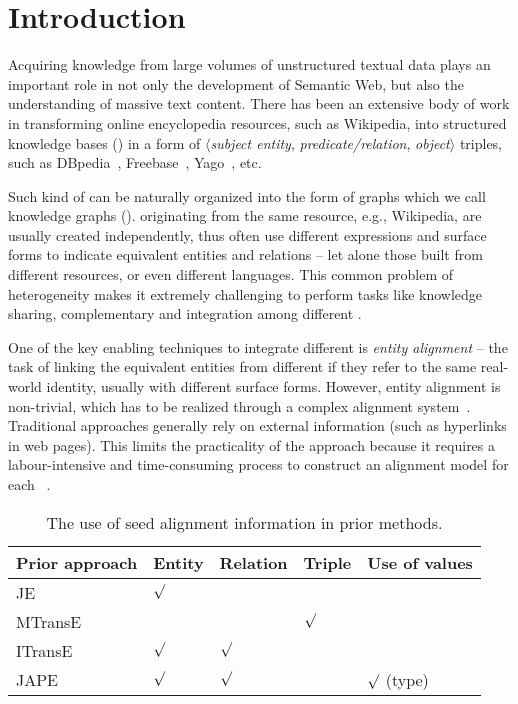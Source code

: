 	
	\section{Introduction}
	\label{section:intro}
    Acquiring knowledge from large volumes of unstructured textual data plays an important role in not only the development of Semantic
    Web, but also the understanding of massive text content. There has been an extensive body of work in transforming online encyclopedia resources, such as
    Wikipedia, into structured knowledge bases (\KBs) in a form of $\langle$\emph{subject entity},
   \emph{ predicate/relation}, \emph{object}$\rangle$ triples, such as DBpedia~\cite{Lehmann2009DBpedia,Auer2007DBpedia},
    Freebase~\cite{Bollacker2007Freebase}, Yago~\cite{Suchanek2008YAGO}, etc.
    	


	Such kind of \KBs can be naturally organized into the form of graphs which we call knowledge graphs (\KGs). \KGs originating from the
same resource, e.g., Wikipedia, are usually created independently, thus often use different expressions and surface forms to indicate
equivalent entities and relations -- let alone those built from different resources, or even different languages. This common problem of
heterogeneity makes it extremely challenging to perform tasks like knowledge sharing, complementary and integration among different \KGs.
	
	One of the key enabling techniques to integrate different \KGs is \emph{entity alignment} -- the task of linking the equivalent
entities from different \KGs if they refer to the same real-world identity, usually with different surface forms. However, entity alignment
is non-trivial, which has to be realized through a complex alignment system~\cite{gokhale2014corleone,scharffe2014ontology}.
Traditional approaches generally rely on external information (such as hyperlinks in web pages). This limits the practicality of the
approach because it requires a labour-intensive and time-consuming process to construct an alignment model for each
\KG~\cite{zhu2017iterative}.


\begin{table}[t!]
	\centering
	\scriptsize
	\begin{tabular}{lllll}
		\toprule
		\bf Prior approach & \bf Entity & \bf Relation & \bf Triple & \bf Use of values \\
		\midrule
		\rowcolor{Gray} JE~\cite{hao2016joint} & ${\surd}$ & & & \\
		MTransE~\cite{chen2016multilingual} & $ $ & $ $ & ${\surd}$ & \\
		\rowcolor{Gray} ITransE~\cite{zhu2017iterative} & ${\surd}$ & ${\surd}$& & \\
		JAPE~\cite{sun2017cross} & ${\surd}$& ${\surd}$& & ${\surd}$ (type)\\
		\bottomrule
	\end{tabular}
	\caption{\small The use of seed alignment information in prior methods.}
	\label{seed}
\end{table}
	
